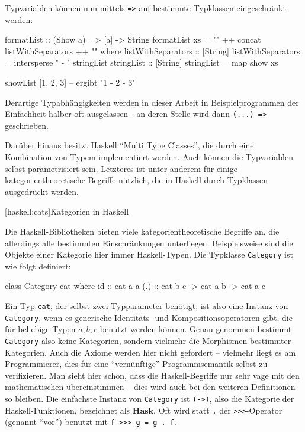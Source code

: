 \documentclass[11pt, a4paper, bibgerm]{scrbook}
\newenvironment{DIFnomarkup}{}{}
\newcommand\icode[1]{\lstinline?#1?}
\newcommand\lsection{}
\begin{document}
Typvariablen können nun mittels \icode{=>} auf bestimmte Typklassen
eingeschränkt werden:
\begin{DIFnomarkup}\begin{code}
formatList :: (Show a) => [a] -> String
formatList xs = "{" ++ concat listWithSeparators ++ "}"
  where listWithSeparators :: [String]
        listWithSeparators = intersperse " - " stringList
        stringList :: [String]
        stringList = map show xs

showList [1, 2, 3] -- ergibt "{1 - 2 - 3}"
\end{code}\end{DIFnomarkup}

Derartige Typabhängigkeiten werden in dieser Arbeit in
Beispielprogrammen der Einfachheit halber oft ausgelassen - an deren
Stelle wird dann \icode{(...) =>} geschrieben.

Darüber hinaus besitzt Haskell ``Multi Type Classes'', die durch eine
Kombination von Typem implementiert werden. Auch können die Typvariablen
selbst parametrisiert sein. Letzteres ist unter anderem für einige
kategorientheoretische Begriffe nützlich, die in Haskell durch
Typklassen ausgedrückt werden.

\lsection[haskell:cats]{Kategorien in Haskell}

Die Haskell-Bibliotheken bieten viele kategorientheoretische Begriffe an,
die allerdings alle bestimmten Einschränkungen
unterliegen. Beispielsweise sind die Objekte einer Kategorie hier immer
Haskell-Typen. Die Typklasse \icode{Category} ist wie folgt definiert:
\begin{DIFnomarkup}\begin{code}
class Category cat where
  id   :: cat a a
  (.)  :: cat b c -> cat a b -> cat a c
\end{code}\end{DIFnomarkup}
Ein Typ \icode{cat}, der selbst zwei Typparameter benötigt, ist also eine
Instanz von \icode{Category}, wenn es generische Identitäts- und
Kompositionsoperatoren gibt, die für beliebige Typen $a,b,c$ benutzt
werden können. Genau genommen bestimmt \icode{Category} also keine
Kategorien, sondern vielmehr die Morphismen bestimmter Kategorien. Auch
die Axiome werden hier nicht gefordert -- vielmehr liegt es am
Programmierer, dies für eine "`vernünftige"' Programmsemantik selbst zu
verifizieren. Man sieht hier schon, dass die Haskell-Begriffe nur sehr
vage mit den mathematischen übereinstimmen -- dies wird auch bei den
weiteren Definitionen so bleiben. Die einfachste Instanz von
\icode{Category} ist \icode{(->)}, also die Kategorie der
Haskell-Funktionen, bezeichnet als $\mathbf{Hask}$.
Oft wird statt \icode{.} der \icode{>>>}-Operator (genannt "`vor"') %
benutzt mit \icode{f >>> g = g . f}. %
\end{document}

